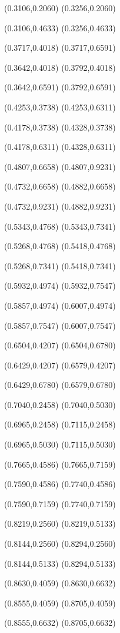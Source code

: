 \PST@Solid(0.3106,0.2060)
(0.3256,0.2060)

\PST@Solid(0.3106,0.4633)
(0.3256,0.4633)

\PST@Solid(0.3717,0.4018)
(0.3717,0.6591)

\PST@Solid(0.3642,0.4018)
(0.3792,0.4018)

\PST@Solid(0.3642,0.6591)
(0.3792,0.6591)

\PST@Solid(0.4253,0.3738)
(0.4253,0.6311)

\PST@Solid(0.4178,0.3738)
(0.4328,0.3738)

\PST@Solid(0.4178,0.6311)
(0.4328,0.6311)

\PST@Solid(0.4807,0.6658)
(0.4807,0.9231)

\PST@Solid(0.4732,0.6658)
(0.4882,0.6658)

\PST@Solid(0.4732,0.9231)
(0.4882,0.9231)

\PST@Solid(0.5343,0.4768)
(0.5343,0.7341)

\PST@Solid(0.5268,0.4768)
(0.5418,0.4768)

\PST@Solid(0.5268,0.7341)
(0.5418,0.7341)

\PST@Solid(0.5932,0.4974)
(0.5932,0.7547)

\PST@Solid(0.5857,0.4974)
(0.6007,0.4974)

\PST@Solid(0.5857,0.7547)
(0.6007,0.7547)

\PST@Solid(0.6504,0.4207)
(0.6504,0.6780)

\PST@Solid(0.6429,0.4207)
(0.6579,0.4207)

\PST@Solid(0.6429,0.6780)
(0.6579,0.6780)

\PST@Solid(0.7040,0.2458)
(0.7040,0.5030)

\PST@Solid(0.6965,0.2458)
(0.7115,0.2458)

\PST@Solid(0.6965,0.5030)
(0.7115,0.5030)

\PST@Solid(0.7665,0.4586)
(0.7665,0.7159)

\PST@Solid(0.7590,0.4586)
(0.7740,0.4586)

\PST@Solid(0.7590,0.7159)
(0.7740,0.7159)

\PST@Solid(0.8219,0.2560)
(0.8219,0.5133)

\PST@Solid(0.8144,0.2560)
(0.8294,0.2560)

\PST@Solid(0.8144,0.5133)
(0.8294,0.5133)

\PST@Solid(0.8630,0.4059)
(0.8630,0.6632)

\PST@Solid(0.8555,0.4059)
(0.8705,0.4059)

\PST@Solid(0.8555,0.6632)
(0.8705,0.6632)

